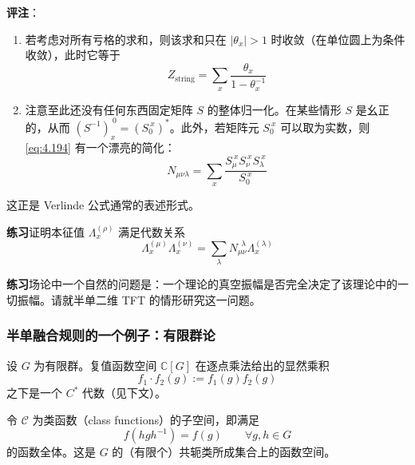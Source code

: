 \textbf{评注}：

\begin{enumerate}
  \item 若考虑对所有亏格的求和，则该求和只在 $|\theta_x|>1$ 时收敛（在单位圆上为条件收敛），此时它等于
  \begin{equation}
    Z_{\mathrm{string}}=\sum_x\frac{\theta_x}{1-\theta_x^{-1}}
    \tag{4.200}
    \label{eq:4.200}
  \end{equation}

  \item 注意至此还没有任何东西固定矩阵 $S$ 的整体归一化。在某些情形 $S$ 是幺正的，从而 $(S^{-1})_x^{\ 0}=(S_0^{\ x})^*$。此外，若矩阵元 $S_0^{\ x}$ 可以取为实数，则 \eqref{eq:4.194} 有一个漂亮的简化：
  \begin{equation}
    N_{\mu\nu\lambda}=\sum_x\frac{S_\mu^{\ x}S_\nu^{\ x}S_\lambda^{\ x}}{S_0^{\ x}}
    \tag{4.201}
    \label{eq:4.201}
  \end{equation}
\end{enumerate}

这正是 Verlinde 公式通常的表述形式。

\textbf{练习}\quad 证明本征值 $\Lambda_x^{(\rho)}$ 满足代数关系
\begin{equation}
  \Lambda_x^{(\mu)}\Lambda_x^{(\nu)}=\sum_\lambda N_{\mu\nu}^{\ \ \lambda}\Lambda_x^{(\lambda)}
  \tag{4.202}
  \label{eq:4.202}
\end{equation}

\textbf{练习}\quad 场论中一个自然的问题是：一个理论的真空振幅是否完全决定了该理论中的一切振幅。请就半单二维 TFT 的情形研究这一问题。


\subsubsection{半单融合规则的一个例子：有限群论} %

设 $G$ 为有限群。复值函数空间 $\mathbb{C}[G]$ 在逐点乘法给出的显然乘积
\begin{equation}
  f_1\cdot f_2(g):=f_1(g)f_2(g)
  \tag{4.203}
  \label{eq:4.203}
\end{equation}
之下是一个 $C^*$ 代数（见下文）。

令 $\mathcal{C}$ 为类函数（class functions）的子空间，即满足
\begin{equation}
  f(hgh^{-1})=f(g)\qquad\forall g,h\in G
  \tag{4.204}
  \label{eq:4.204}
\end{equation}
的函数全体。这是 $G$ 的（有限个）共轭类所成集合上的函数空间。

